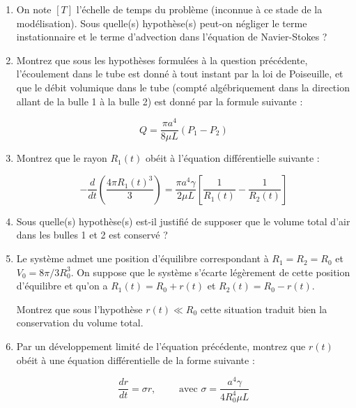 \begin{enumerate}
{\begin{enumerate}


\item On note $[T]$ l'échelle de temps du problème (inconnue à ce stade de la modélisation). 
Sous quelle(s) hypothèse(s) peut-on négliger le terme instationnaire et le terme d'advection dans l'équation de Navier-Stokes ?


\item
Montrez que sous les hypothèses formulées à la question précédente, l'écoulement dans
le tube est donné à tout instant par la loi de Poiseuille, et que le débit volumique
dans le tube (compté algébriquement dans la direction allant de la bulle
1 à la bulle 2) est donné par la formule suivante :

$$
Q = \frac{\pi a^4}{8 \mu L} (P_1-P_2)
$$



\item Montrez que le rayon $R_1(t)$ obéit à l'équation 
différentielle suivante :

$$
- \frac{d}{dt} \left( \frac{4 \pi R_1(t)^3}{3} \right) 
= \frac{\pi a^4\gamma }{2 \mu L} \left[ \frac{1}{R_1(t)} -     \frac{1}{R_2(t)}  \right]
$$

\item Sous quelle(s) hypothèse(s) est-il justifié de supposer que le volume
total d'air dans les bulles 1 et 2 est conservé ?

\item Le système admet une position d'équilibre correspondant à $R_1 = R_2 = R_0$ 
et $V_0 = 8 \pi/3 R_0^3$. On suppose que le système s'écarte légèrement 
de cette position d'équilibre et qu'on a $R_1(t) = R_0 + r(t)$ et $R_2(t) = R_0 - r(t)$.

Montrez que sous l'hypothèse $r(t) \ll R_0$ cette situation traduit bien la conservation du volume total. 


\item Par un développement limité de l'équation précédente, montrez que $r(t)$ 
obéit à une équation différentielle de la forme suivante :

$$
\frac{dr}{dt} 
= \sigma r , \qquad  \mbox{ avec } \sigma = \frac{a^4 \gamma}{4 R_0^4 \mu L} 
$$


\end{enumerate}}
\end{enumerate}
